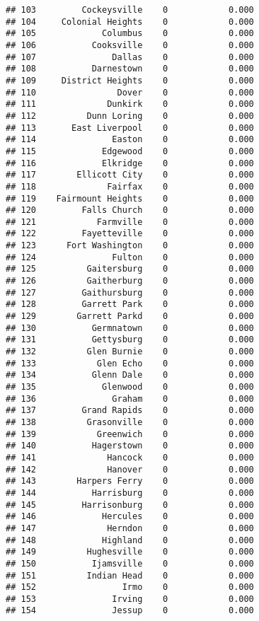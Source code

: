 \documentclass[]{article}
\begin{document}
\begin{verbatim}
## 103         Cockeysville    0            0.000
## 104     Colonial Heights    0            0.000
## 105             Columbus    0            0.000
## 106           Cooksville    0            0.000
## 107               Dallas    0            0.000
## 108           Darnestown    0            0.000
## 109     District Heights    0            0.000
## 110                Dover    0            0.000
## 111              Dunkirk    0            0.000
## 112          Dunn Loring    0            0.000
## 113       East Liverpool    0            0.000
## 114               Easton    0            0.000
## 115             Edgewood    0            0.000
## 116             Elkridge    0            0.000
## 117        Ellicott City    0            0.000
## 118              Fairfax    0            0.000
## 119    Fairmount Heights    0            0.000
## 120         Falls Church    0            0.000
## 121            Farmville    0            0.000
## 122         Fayetteville    0            0.000
## 123      Fort Washington    0            0.000
## 124               Fulton    0            0.000
## 125          Gaitersburg    0            0.000
## 126          Gaitherburg    0            0.000
## 127         Gaithursburg    0            0.000
## 128         Garrett Park    0            0.000
## 129        Garrett Parkd    0            0.000
## 130           Germnatown    0            0.000
## 131           Gettysburg    0            0.000
## 132          Glen Burnie    0            0.000
## 133            Glen Echo    0            0.000
## 134           Glenn Dale    0            0.000
## 135             Glenwood    0            0.000
## 136               Graham    0            0.000
## 137         Grand Rapids    0            0.000
## 138          Grasonville    0            0.000
## 139            Greenwich    0            0.000
## 140           Hagerstown    0            0.000
## 141              Hancock    0            0.000
## 142              Hanover    0            0.000
## 143        Harpers Ferry    0            0.000
## 144           Harrisburg    0            0.000
## 145         Harrisonburg    0            0.000
## 146             Hercules    0            0.000
## 147              Herndon    0            0.000
## 148             Highland    0            0.000
## 149          Hughesville    0            0.000
## 150           Ijamsville    0            0.000
## 151          Indian Head    0            0.000
## 152                 Irmo    0            0.000
## 153               Irving    0            0.000
## 154               Jessup    0            0.000

\end{verbatim}
\end{document}
